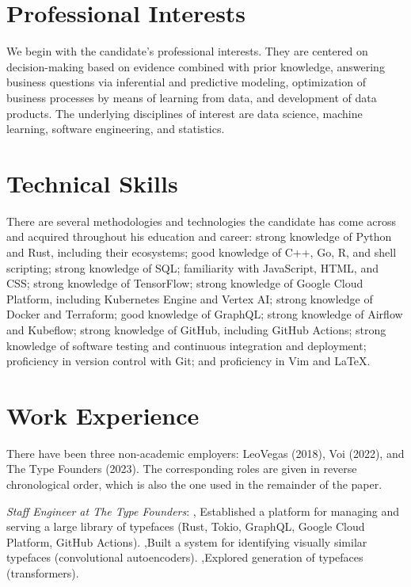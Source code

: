 \documentclass[journal]{IEEEtran}
\begin{document}
\section{Professional Interests} 

We begin with the candidate's professional interests. They are centered on
decision-making based on evidence combined with prior knowledge, answering
business questions via inferential and predictive modeling, optimization of
business processes by means of learning from data, and development of data
products. The underlying disciplines of interest are data science, machine
learning, software engineering, and statistics.

\section{Technical Skills} 

There are several methodologies and technologies the candidate has come across
and acquired throughout his education and career: strong knowledge of Python and
Rust, including their ecosystems; good knowledge of C++, Go, R, and shell
scripting; strong knowledge of SQL; familiarity with JavaScript, HTML, and CSS;
strong knowledge of TensorFlow; strong knowledge of Google Cloud Platform,
including Kubernetes Engine and Vertex AI; strong knowledge of Docker and
Terraform; good knowledge of GraphQL; strong knowledge of Airflow and Kubeflow;
strong knowledge of GitHub, including GitHub Actions; strong knowledge of
software testing and continuous integration and deployment; proficiency in
version control with Git; and proficiency in Vim and LaTeX.

\section{Work Experience} 

There have been three non-academic employers: LeoVegas (2018), Voi (2022), and
The Type Founders (2023). The corresponding roles are given in reverse
chronological order, which is also the one used in the remainder of the paper.

\date{February 2023--Present} \emph{Staff Engineer at The Type Founders}: \sep
Established a platform for managing and serving a large library of typefaces
(Rust, Tokio, GraphQL, Google Cloud Platform, GitHub Actions). \sep Built a
system for identifying visually similar typefaces (convolutional autoencoders).
\sep Explored generation of typefaces (transformers).
\end{document}
